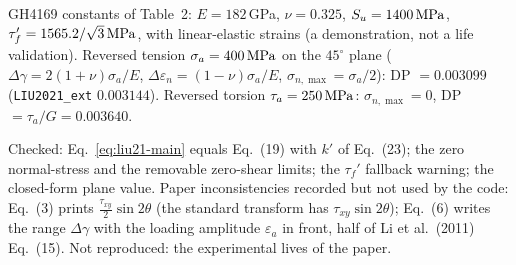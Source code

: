 GH4169 constants of Table~2: $E=182$\,GPa, $\nu=0.325$, $S_u=1400\,\mathrm{MPa}$,
$\tau_f'=1565.2/\sqrt3\,\mathrm{MPa}$, with linear-elastic strains (a demonstration, not a life validation).
Reversed tension $\sigma_a=400\,\mathrm{MPa}$ on the $45^\circ$ plane
($\Delta\gamma=2(1+\nu)\sigma_a/E$, $\Delta\varepsilon_n=(1-\nu)\sigma_a/E$,
$\sigma_{n,\max}=\sigma_a/2$): DP $=0.003099$ (\texttt{LIU2021\_ext} $0.003144$). Reversed torsion
$\tau_a=250\,\mathrm{MPa}$: $\sigma_{n,\max}=0$, DP $=\tau_a/G=0.003640$.

 Checked: Eq.~\eqref{eq:liu21-main} equals Eq.~(19) with $k'$ of Eq.~(23); the
zero normal-stress and the removable zero-shear limits; the $\tau_f'$ fallback warning; the
closed-form plane value. Paper inconsistencies recorded but not used by the code: Eq.~(3) prints
$\tfrac{\tau_{xy}}{2}\sin2\theta$ (the standard transform has $\tau_{xy}\sin2\theta$); Eq.~(6)
writes the range $\Delta\gamma$ with the loading amplitude $\varepsilon_a$ in front, half of
Li et al.\ (2011) Eq.~(15). Not reproduced: the experimental lives of the paper.
